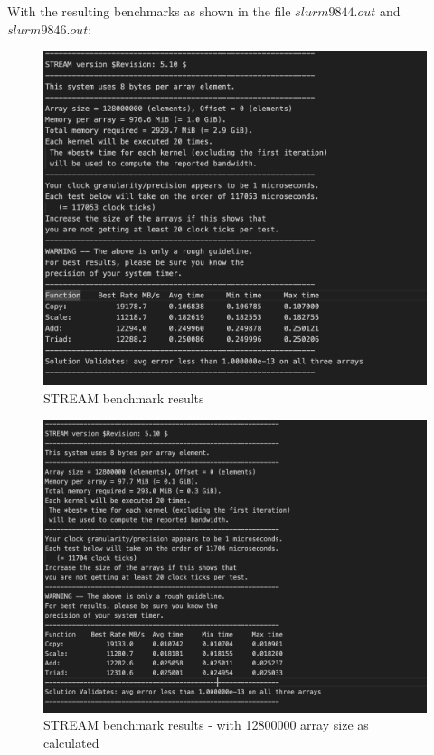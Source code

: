 \documentclass[unicode,11pt,a4paper,oneside,numbers=endperiod,openany]{scrartcl}
\begin{document}
With the resulting benchmarks as shown in the file $slurm9844.out$ and $slurm9846.out$:

\begin{figure}[H]
    \centering
    \includegraphics[width=\textwidth]{./exercise2/5.png}
    \caption{STREAM benchmark results}
\end{figure}

\begin{figure}[H]
    \centering
    \includegraphics[width=\textwidth]{./exercise2/6.png}
    \caption{STREAM benchmark results  - with 12800000 array size as calculated} 
\end{figure}
\end{document}
